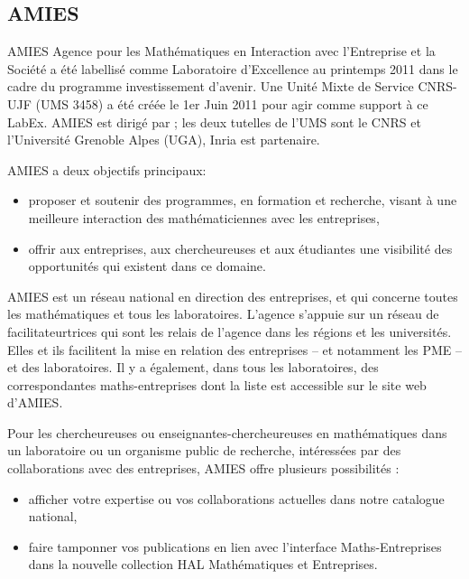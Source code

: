 \subsection{AMIES }
 \label{AMIES}

\noindent AMIES  \og{}Agence pour les Math\'ematiques en Interaction avec l'Entreprise
et la Soci\'et\'e\fg{} a \'et\'e labellis\'e comme Laboratoire d'Excellence au
printemps 2011 dans le cadre du programme investissement d'avenir. Une Unit\'e Mixte de
Service CNRS-UJF (UMS 3458) a \'et\'e cr\'e\'ee le 1er Juin 2011 pour agir
comme support \`a ce LabEx.  AMIES est dirig\'e par ;  
les deux tutelles de l'UMS sont le CNRS et l'Universit{\'e} Grenoble Alpes (UGA), Inria est partenaire.

AMIES a deux objectifs principaux:
\begin{itemize}
\item  proposer et soutenir des programmes, en formation et recherche,
  visant \`a une meilleure interaction des math\'ematicien\mp nes avec les  entreprises, 
\item offrir aux entreprises, aux chercheur\mp euse\mp s et aux \'etudiant\mp e\mp s
  une visibilit\'e des opportunit\'es qui existent dans ce domaine. 
\end{itemize}

AMIES est un r\'eseau national en direction des entreprises, et qui concerne toutes les
math\'ematiques et tous les laboratoires.  
L'agence  s'appuie sur un r\'eseau  de facilitateur\mp trices qui sont  les relais de l'agence dans les r\'egions et les universit\'es.
Elles et ils facilitent la mise en relation des entreprises -- et notamment les PME -- et des laboratoires.
Il y a \'egalement, dans tous les laboratoires, des correspondant\mp e\mp s maths-entreprises dont la liste est
accessible sur le site web d'AMIES.

Pour les chercheur\mp euse\mp s ou enseignant\mp e\mp s-chercheur\mp euse\mp s en math\'ematiques dans un laboratoire ou un organisme public de recherche,
int\'eress\'e\mp e\mp s par des collaborations avec des entreprises,  AMIES offre plusieurs possibilit\'es : 
\begin{itemize}
\item  afficher votre expertise ou vos collaborations
  actuelles dans notre catalogue national,
\item   faire tamponner vos publications en lien avec
  l'interface Maths-Entreprises dans la nouvelle collection HAL
  \og{}Math\'ematiques et Entreprises\fg{}.
\end{itemize}

